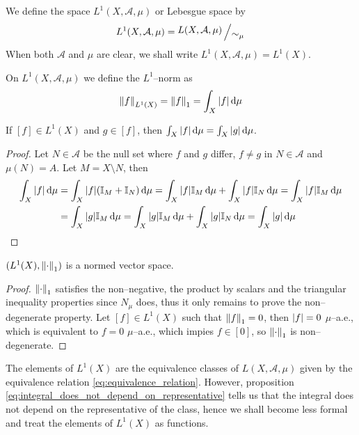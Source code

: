 \begin{definition*}
	We define the space $L^1(X, \mathcal{A}, \mu)$ or Lebesgue space by
	\[
		L^1(X, \mathcal{A}, \mu) = \quotient{L(X, \mathcal{A}, \mu)}{\sim_\mu}
	\]
	When both $\mathcal{A}$ and $\mu$ are clear, we shall write $L^1(X, \mathcal{A}, \mu) = L^1(X)$.
\end{definition*}

\begin{definition*}
	On $L^1(X, \mathcal{A}, \mu)$ we define the $L^1$--norm as
	\[
		\norm{f}_{L^1(X)} = \norm{f}_1 = \int_X \abs{f} \dd{\mu}
	\]
\end{definition*}


\begin{prop} \label{eq:integral_does_not_depend_on_representative}
	If $[f] \in L^1(X)$ and $g \in [f]$, then $\int_X \abs{f} \dd{\mu} = \int_X
	\abs{g} \dd{\mu}$.
\end{prop}
\begin{proof}
	Let $N \in \mathcal{A}$ be the null set where $f$ and $g$ differ, \ie $f
	\neq g$ in $N \in \mathcal{A}$ and $\mu(N) = A$. Let $M = X \setminus N$,
	then
	\begin{align*}
		\int_X \abs{f} \dd{\mu} &= 
		\int_X \abs{f} (\mathbb{I}_M + \mathbb{I}_N) \dd{\mu} = 
		\int_X \abs{f} \mathbb{I}_M \dd{\mu} + \int_X \abs{f} \mathbb{I}_N \dd{\mu} = 
		\int_X \abs{f} \mathbb{I}_M \dd{\mu} \\ &=
		\int_X \abs{g} \mathbb{I}_M \dd{\mu} = 
		\int_X \abs{g} \mathbb{I}_M \dd{\mu} + \int_X \abs{g} \mathbb{I}_N \dd{\mu} = 
		\int_X \abs{g} \dd{\mu}
	\end{align*}
\end{proof}

\begin{theorem}
	$(L^1(X), \norm{\cdot}_1)$ is a normed vector space.
\end{theorem}
\begin{proof}
	$\norm{\cdot}_1$ satisfies the non--negative, the product by scalars and the
	triangular inequality properties since $N_\mu$ does, thus it only remains to
	prove the non--degenerate property. Let $[f] \in L^1(X)$ such that
	$\norm{f}_1 = 0$, then $\abs{f} = 0$ $\mu$--a.e., which is equivalent to $f = 0$
	$\mu$--a.e., which impies $f \in [0]$, so $\norm{\cdot}_1$ is non--degenerate.
\end{proof}

The elements of $L^1(X)$ are the equivalence classes of $L(X, \mathcal{A}, \mu)$
given by the equivalence relation \eqref{eq:equivalence_relation}. However,
proposition \ref{eq:integral_does_not_depend_on_representative} tells us that
the integral does not depend on the representative of the class, hence we shall
become less formal and treat the elements of  $L^1(X)$ as functions.

